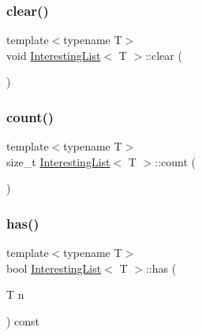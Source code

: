 \subsubsection{\texorpdfstring{clear()}{clear()}}
{\footnotesize\ttfamily template$<$typename T$>$ \\
void \mbox{\hyperlink{class_interesting_list}{Interesting\+List}}$<$ T $>$\+::clear (\begin{DoxyParamCaption}{ }\end{DoxyParamCaption})\hspace{0.3cm}{\ttfamily [inline]}}

\mbox{\label{class_interesting_list_a85fe3db13b57fa70901c47ca6d581d0d}} 
\subsubsection{\texorpdfstring{count()}{count()}}
{\footnotesize\ttfamily template$<$typename T$>$ \\
size\+\_\+t \mbox{\hyperlink{class_interesting_list}{Interesting\+List}}$<$ T $>$\+::count (\begin{DoxyParamCaption}{ }\end{DoxyParamCaption})\hspace{0.3cm}{\ttfamily [inline]}}

\mbox{\label{class_interesting_list_aae59505a735e134d456d8f5f5e878aec}} 
\subsubsection{\texorpdfstring{has()}{has()}}
{\footnotesize\ttfamily template$<$typename T$>$ \\
bool \mbox{\hyperlink{class_interesting_list}{Interesting\+List}}$<$ T $>$\+::has (\begin{DoxyParamCaption}\item[{T}]{n }\end{DoxyParamCaption}) const\hspace{0.3cm}{\ttfamily [inline]}}

\mbox{\label{class_interesting_list_a0f1175eed5455d92c96a0555ccb7aed0}} 

